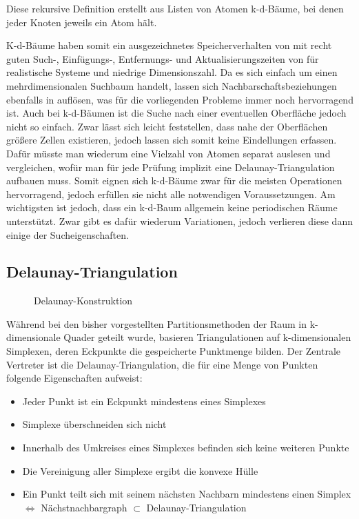 Diese rekursive Definition erstellt aus Listen von Atomen k-d-Bäume, bei denen jeder Knoten jeweils ein Atom hält.

K-d-Bäume haben somit ein ausgezeichnetes Speicherverhalten von  mit recht guten Such-, Einfügungs-, Entfernungs- und Aktualisierungszeiten von  für realistische Systeme und niedrige Dimensionszahl.
Da es sich einfach um einen mehrdimensionalen Suchbaum handelt, lassen sich Nachbarschaftsbeziehungen ebenfalls in  auflösen, was für die vorliegenden Probleme immer noch hervorragend ist.
Auch bei k-d-Bäumen ist die Suche nach einer eventuellen Oberfläche jedoch nicht so einfach.
Zwar lässt sich leicht feststellen, dass nahe der Oberflächen größere Zellen existieren, jedoch lassen sich somit keine Eindellungen erfassen.
Dafür müsste man wiederum eine Vielzahl von Atomen separat auslesen und vergleichen, wofür man für jede Prüfung implizit eine Delaunay-Triangulation aufbauen muss.
Somit eignen sich k-d-Bäume zwar für die meisten Operationen hervorragend, jedoch erfüllen sie nicht alle notwendigen Voraussetzungen.
Am wichtigsten ist jedoch, dass ein k-d-Baum allgemein keine periodischen Räume unterstützt.
Zwar gibt es dafür wiederum Variationen, jedoch verlieren diese dann einige der Sucheigenschaften.

\subsection{Delaunay-Triangulation}

\begin{figure}[bhpt]
  \centering
  \def\svgwidth{\textwidth}
  
  \caption[Delaunay-Konstruktion]{Delaunay-Konstruktion}
  \label{fig:delaunay}
\end{figure}

Während bei den bisher vorgestellten Partitionsmethoden der Raum in k-dimensionale Quader geteilt wurde, basieren Triangulationen auf k-dimensionalen Simplexen, deren Eckpunkte die gespeicherte Punktmenge bilden.
Der Zentrale Vertreter ist die Delaunay-Triangulation, die für eine Menge von Punkten folgende Eigenschaften aufweist:

\begin{itemize}
\item Jeder Punkt ist ein Eckpunkt mindestens eines Simplexes
\item Simplexe überschneiden sich nicht
\item Innerhalb des Umkreises eines Simplexes befinden sich keine weiteren Punkte
\item Die Vereinigung aller Simplexe ergibt die konvexe Hülle
\item Ein Punkt teilt sich mit seinem nächsten Nachbarn mindestens einen Simplex \\
  $\Leftrightarrow$ Nächstnachbargraph $\subset$ Delaunay-Triangulation
\end{itemize}

